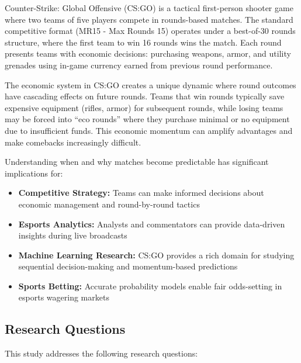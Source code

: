 \documentclass[11pt]{article}
\begin{document}
Counter-Strike: Global Offensive (CS:GO) is a tactical first-person shooter game where two teams of five players compete in rounds-based matches. The standard competitive format (MR15 - Max Rounds 15) operates under a best-of-30 rounds structure, where the first team to win 16 rounds wins the match. Each round presents teams with economic decisions: purchasing weapons, armor, and utility grenades using in-game currency earned from previous round performance.

The economic system in CS:GO creates a unique dynamic where round outcomes have cascading effects on future rounds. Teams that win rounds typically save expensive equipment (rifles, armor) for subsequent rounds, while losing teams may be forced into ``eco rounds'' where they purchase minimal or no equipment due to insufficient funds. This economic momentum can amplify advantages and make comebacks increasingly difficult.

Understanding when and why matches become predictable has significant implications for:

\begin{itemize}
    \item \textbf{Competitive Strategy:} Teams can make informed decisions about economic management and round-by-round tactics
    \item \textbf{Esports Analytics:} Analysts and commentators can provide data-driven insights during live broadcasts
    \item \textbf{Machine Learning Research:} CS:GO provides a rich domain for studying sequential decision-making and momentum-based predictions
    \item \textbf{Sports Betting:} Accurate probability models enable fair odds-setting in esports wagering markets
\end{itemize}

\subsection{Research Questions}

This study addresses the following research questions:
\end{document}
